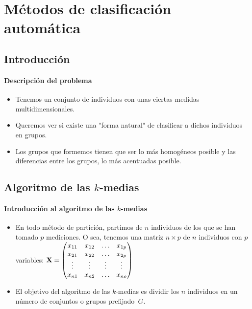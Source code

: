 


\chapter{Métodos de clasificación automática}

\section{Introducción}
\begin{frame}
\frametitle{Descripción del problema}
\begin{itemize}
\item<2->{Tenemos un conjunto de individuos con unas ciertas medidas multidimensionales.}
\item<3->{Queremos ver si existe una "forma natural" de clasificar a dichos individuos en grupos.}
\item<4->{Los grupos que formemos tienen que ser lo más homogéneos posible y las diferencias entre los grupos, lo más acentuadas posible.}
\end{itemize}
\end{frame}

\section{Algoritmo de las $k$-medias}
\begin{frame}
\frametitle{Introducción al algoritmo de las $k$-medias}
\begin{itemize}
\item<2->{En todo método de partición, partimos de $n$ individuos de los que se han tomado $p$ mediciones. O sea, tenemos una matriz $n\times p$ de $n$ individuos con $p$ variables:
$\mathbf{X}=
\begin{pmatrix}
x_{11}&x_{12}&\ldots&x_{1p} \\ 
x_{21}&x_{22}&\ldots&x_{2p} \\
\vdots&\vdots&\vdots&\vdots \\
x_{n1}&x_{n2}&\ldots&x_{no}
\end{pmatrix}$}
\item<3->{El objetivo del algoritmo de las $k$-medias es dividir los $n$ individuos en un número de conjuntos o grupos prefijado~$G$.}
\end{itemize}
\end{frame}

